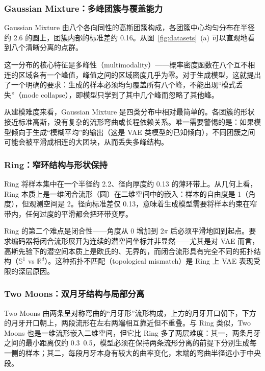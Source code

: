 \documentclass[UTF8,a4paper,12pt]{ctexart}
\begin{document}
\subsubsection{Gaussian Mixture：多峰团簇与覆盖能力}

Gaussian Mixture 由八个各向同性的高斯团簇构成，各团簇中心均匀分布在半径约 2.6 的圆上，团簇内部的标准差约 0.16。从图~\ref{fig:datasets}~(a) 可以直观地看到八个清晰分离的点群。

这一分布的核心特征是多峰性（multimodality）——概率密度函数在八个互不相连的区域各有一个峰值，峰值之间的区域密度几乎为零。对于生成模型，这就提出了一个明确的要求：生成的样本必须均匀覆盖所有八个峰，不能出现“模式丢失”（mode collapse），即模型只学到了其中几个峰而忽略了其他峰。

从建模难度来看，Gaussian Mixture 是四类分布中相对最简单的。各团簇的形状接近标准高斯，没有复杂的流形弯曲或长程依赖关系。唯一需要警惕的是：如果模型倾向于生成“模糊平均”的输出（这是 VAE 类模型的已知倾向），不同团簇之间可能会被平滑成相连的大团块，从而丢失多峰结构。

\subsubsection{Ring：窄环结构与形状保持}

Ring 将样本集中在一个半径约 2.2、径向厚度约 0.13 的薄环带上。从几何上看，Ring 本质上是一维闭合流形（圆）在二维空间中的嵌入：样本的自由度是 1（角度），但观测空间是 2。径向标准差仅 0.13，意味着生成模型需要将样本约束在窄带内，任何过度的平滑都会把环带变厚。

Ring 的第二个难点是闭合性——角度从 0 增加到 $2\pi$ 后必须平滑地回到起点。要求编码器将闭合流形展开为连续的潜空间坐标并非显然——尤其是对 VAE 而言，高斯先验下的潜空间本质上是欧氏的、无界的，而闭合流形具有完全不同的拓扑结构（$\mathbb{S}^1$ vs $\mathbb{R}^d$）。这种拓扑不匹配（topological mismatch）是 Ring 上 VAE 表现受限的深层原因。

\subsubsection{Two Moons：双月牙结构与局部分离}

Two Moons 由两条呈对称弯曲的“月牙形”流形构成，上方的月牙开口朝下，下方的月牙开口朝上，两段流形在左右两端相互靠近但不重叠。与 Ring 类似，Two Moons 也是一维流形嵌入二维空间，但它比 Ring 多了两层难度：其一，两条月牙之间的最小距离仅约 0.3~0.5，模型必须在保持两条流形分离的前提下分别生成每一侧的样本；其二，每段月牙本身有较大的曲率变化，末端的弯曲半径远小于中央段。
\end{document}

